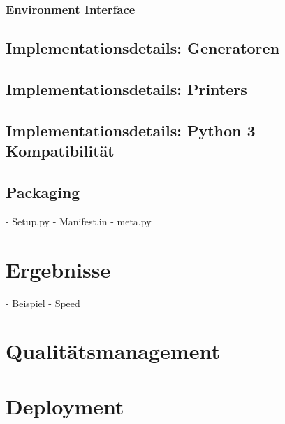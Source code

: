 \subsubsection{Environment Interface}
\label{swidgenerator:architektur:environments:interface}

\subsection{Implementationsdetails: Generatoren}
\label{swidgenerator:architektur:generatoren}

\subsection{Implementationsdetails: Printers}
\label{swidgenerator:architektur:printers}


\subsection{Implementationsdetails: Python 3 Kompatibilität}


\subsection{Packaging}

- Setup.py
- Manifest.in
- meta.py



\section{Ergebnisse}

- Beispiel
- Speed



\section{Qualitätsmanagement}
\label{swidgenerator:architektur:qa}



\section{Deployment}
\label{swidgenerator:architektur:deployment}

